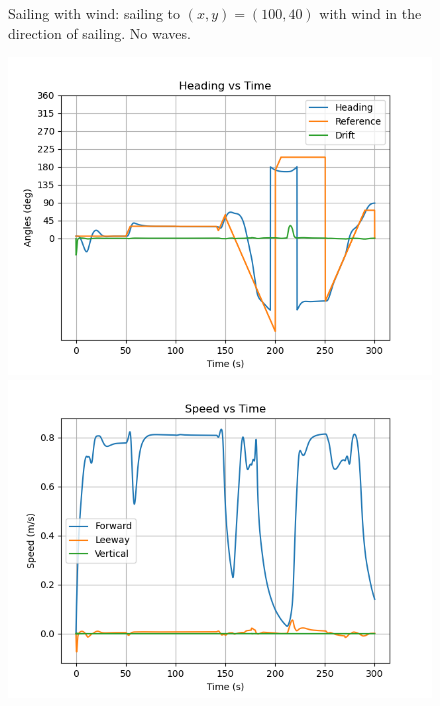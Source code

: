 \documentclass[conference]{IEEEtran}
\begin{document}
\begin{figure}
    \caption{Sailing with wind: sailing to \((x,y) = (100,40)\) with wind in the direction of sailing. No waves.}
    \label{fig:sail_with_wind}
\end{figure}

\begin{figure}
    \centering
\includegraphics[trim={0.5cm 0.25cm 1.25cm 0.75cm },clip]{documents/final_pres_figs/right_to_wind_to_40_40_heading.png}
         \includegraphics[trim={0.5cm 0.25cm 1.25cm 0.75cm },clip]{documents/final_pres_figs/right_to_wind_to_40_40_speed.png}

\end{figure}
\end{document}
